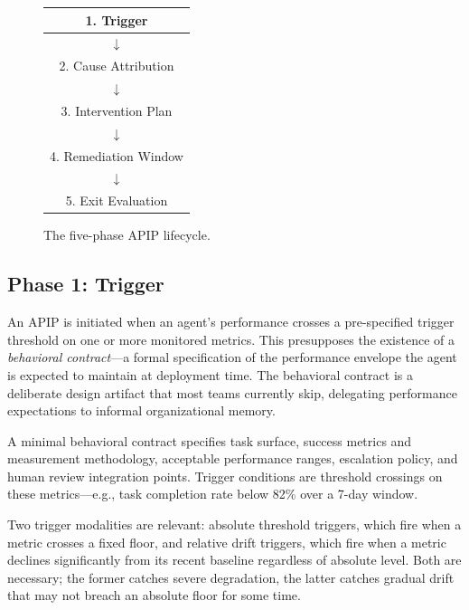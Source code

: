 \documentclass[conference]{IEEEtran}
\begin{document}
\begin{figure}[t]
  \centering
  \footnotesize
  \setlength{\tabcolsep}{3pt}
  \renewcommand{\arraystretch}{1.3}
  \begin{tabular}{@{}|c|c|c|@{}}
    \hline
    \multicolumn{3}{|c|}{1. Trigger} \\
    \hline
    \multicolumn{3}{|c|}{$\downarrow$} \\
    \multicolumn{3}{|c|}{2. Cause Attribution} \\
    \hline
    \multicolumn{3}{|c|}{$\downarrow$} \\
    \multicolumn{3}{|c|}{3. Intervention Plan} \\
    \hline
    \multicolumn{3}{|c|}{$\downarrow$} \\
    \multicolumn{3}{|c|}{4. Remediation Window} \\
    \hline
    \multicolumn{3}{|c|}{$\downarrow$} \\
    \multicolumn{3}{|c|}{5. Exit Evaluation} \\
    \hline
  \end{tabular}
  \caption{The five-phase APIP lifecycle.}
  \label{fig:lifecycle}
\end{figure}

\subsection{Phase 1: Trigger}
\label{subsec:trigger}

An APIP is initiated when an agent's performance crosses a pre-specified
trigger threshold on one or more monitored metrics. This presupposes the
existence of a \emph{behavioral contract}---a formal specification of the
performance envelope the agent is expected to maintain at deployment time. The
behavioral contract is a deliberate design artifact that most teams currently
skip, delegating performance expectations to informal organizational memory.

A minimal behavioral contract specifies task surface, success metrics and
measurement methodology, acceptable performance ranges, escalation policy, and
human review integration points. Trigger conditions are threshold crossings on
these metrics---e.g., task completion rate below 82\% over a 7-day window.

Two trigger modalities are relevant: absolute threshold triggers, which fire
when a metric crosses a fixed floor, and relative drift triggers, which fire
when a metric declines significantly from its recent baseline regardless of
absolute level. Both are necessary; the former catches severe degradation, the
latter catches gradual drift that may not breach an absolute floor for some
time.
\end{document}
